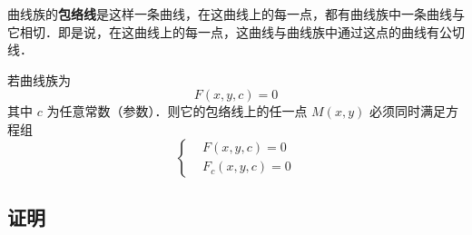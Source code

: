 
曲线族的\textbf{包络线}是这样一条曲线，在这曲线上的每一点，都有曲线族中一条曲线与它相切．即是说，在这曲线上的每一点，这曲线与曲线族中通过这点的曲线有公切线．

若曲线族为 
\begin{equation}
F(x,y,c)=0
\end{equation}
其中 $c$ 为任意常数（参数）．则它的包络线上的任一点 $M(x,y)$ 必须同时满足方程组
\begin{equation}
\left\{\begin{aligned}
&F(x,y,c)=0\\
&F_c(x,y,c)=0
\end{aligned}\right.
\end{equation}
\subsection{证明}